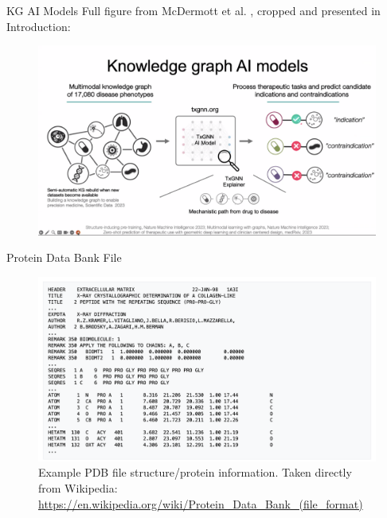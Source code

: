 \documentclass{beamer}
\begin{document}
\begin{frame}{KG AI Models}
    Full figure from McDermott et al. \cite{mcdermott_structure-inducing_2023}, cropped and presented in Introduction:
    \begin{figure}
        \centering
        \includegraphics[scale=0.13]{Junwei_KG_Models_Infograph.png}
    \end{figure}
\end{frame}

\begin{frame}{Protein Data Bank File}
    \begin{figure}
        \centering
        \includegraphics[scale=0.37]{PDB_File_Ex.png}
        \caption{Example PDB file structure/protein information. Taken directly from Wikipedia: \url{https://en.wikipedia.org/wiki/Protein_Data_Bank_(file_format)}
        }
    \end{figure}
\end{frame}
\end{document}
